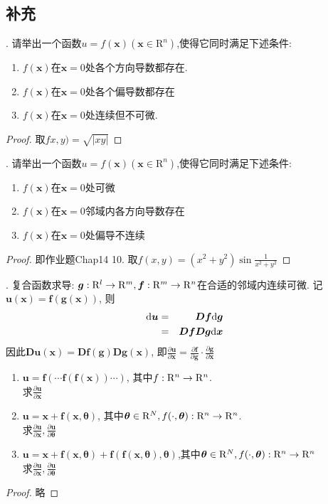 \documentclass[a4paper,12pt]{article}
\begin{document}
\subsection*{补充}
. 请举出一个函数$u=f(\bm{x})(\bm{x}\in\mathrm{R}^n)$,使得它同时满足下述条件:
\begin{enumerate}
  \itemsep-0.5em 
  \item $f(\bm{x})$在$\bm{x}=0$处各个方向导数都存在.
  \item $f(\bm{x})$在$\bm{x}=0$处各个偏导数都存在
  \item $f(\bm{x})$在$\bm{x}=0$处连续但不可微.
\end{enumerate}
\begin{proof}
  取$fx,y)=\sqrt{|xy|}$
\end{proof}

. 请举出一个函数$u=f(\bm{x})(\bm{x}\in\mathrm{R}^n)$,使得它同时满足下述条件:
\begin{enumerate}
  \itemsep-0.5em 
  \item $f(\bm{x})$在$\bm{x}=0$处可微
  \item $f(\bm{x})$在$\bm{x}=0$邻域内各方向导数存在
  \item $f(\bm{x})$在$\bm{x}=0$处偏导不连续
\end{enumerate}
\begin{proof}
  即作业题Chap14 10. 取$f(x,y)=(x^2+y^2)\sin\frac{1}{x^2+y^2}$
\end{proof}

. 复合函数求导: $\bm{g}:\mathrm{R}^l\to\mathrm{R}^m,\bm{f}:\mathrm{R}^m\to\mathrm{R}^n$在合适的邻域内连续可微.
记$\bm{u}(\bm{x})=\bm{f}(\bm{g}(\bm{x}))$, 则
\begin{eqnarray*}
  \mathrm{d}\bm{u}&=&\bm{D}\bm{f}\mathrm{d}\bm{g}\\
    &=& \bm{D}\bm{f}\bm{D}\bm{g}\mathrm{d}\bm{x}
\end{eqnarray*}
因此$\bm{D}\bm{u}(\bm{x})=\bm{D}\bm{f}(\bm{g})\bm{D}\bm{g}(\bm{x})$, 即$\frac{\partial\bm{u}}{\partial\bm{x}}=\frac{\partial\bm{f}}{\partial\bm{g}}\cdot\frac{\partial\bm{g}}{\partial\bm{x}}$
\begin{enumerate}
  \itemsep-0.5em 
  \item $\bm{u}=\bm{f}(\cdots\bm{f}(\bm{f}(\bm{x}))\cdots)$, 其中$f:\mathrm{R}^n\to\mathrm{R}^n$. \\
    求$\frac{\partial\bm{u}}{\partial\bm{x}}$
  \item $\bm{u}=\bm{x}+\bm{f}(\bm{x},\bm{\theta})$, 其中$\bm{\theta}\in\mathrm{R}^N,f(\cdot,\bm{\theta}):\mathrm{R}^n\to\mathrm{R}^n$.\\
    求$\frac{\partial\bm{u}}{\partial\bm{x}},\frac{\partial\bm{u}}{\partial\bm{\theta}}$
  \item $\bm{u}=\bm{x}+\bm{f}(\bm{x},\bm{\theta})+\bm{f}(\bm{f}(\bm{x},\bm{\theta}),\bm{\theta})$,其中$\bm{\theta}\in\mathrm{R}^N,f(\cdot,\bm{\theta}):\mathrm{R}^n\to\mathrm{R}^n$\\
    求$\frac{\partial\bm{u}}{\partial\bm{x}},\frac{\partial\bm{u}}{\partial\bm{\theta}}$
\end{enumerate}
\begin{proof}
  略
\end{proof}
\end{document}
